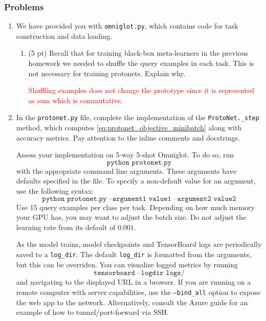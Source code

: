 \documentclass[12pt]{article}
\begin{document}
    \subsubsection*{Problems}


    \begin{enumerate}
        \item We have provided you with \texttt{omniglot.py}, which contains code for task construction and data loading.
        \begin{enumerate}[label=(\alph*)]
            \item (5 pt) Recall that for training black-box meta-learners in the previous homework we needed to shuffle the query examples in each task. This is not necessary for training protonets. Explain why.

            \textcolor{red}{Shuffling examples does not change the prototype since it is represented as sum which is commutative.}

        \end{enumerate}

        \newpage
        \item In the \texttt{protonet.py} file, complete the implementation of the \texttt{ProtoNet.\_step} method, which computes \eqref{eq:protonet_objective_minibatch} along with accuracy metrics. Pay attention to the inline comments and docstrings.

        Assess your implementation on 5-way 5-shot Omniglot. To do so, run
        \begin{equation*}
            \texttt{python protonet.py}
        \end{equation*}
        with the appropriate command line arguments. These arguments have defaults specified in the file. To specify a non-default value for an argument, use the following syntax:
        \begin{equation*}
            \texttt{python protonet.py --argument1 value1 --argument2 value2}
        \end{equation*}
        Use 15 query examples per class per task. Depending on how much memory your GPU has, you may want to adjust the batch size. Do not adjust the learning rate from its default of $0.001$.

        As the model trains, model checkpoints and TensorBoard logs are periodically saved to a \texttt{log\_dir}. The default \texttt{log\_dir} is formatted from the arguments, but this can be overriden. You can visualize logged metrics by running
        \begin{equation*}
            \texttt{tensorboard --logdir logs/}
        \end{equation*}
        and navigating to the displayed URL in a browser. If you are running on a remote computer with server capabilities, use the \texttt{--bind\_all} option to expose the web app to the network. Alternatively, consult the Azure guide for an example of how to tunnel/port-forward via SSH.


\end{enumerate}
\end{document}
